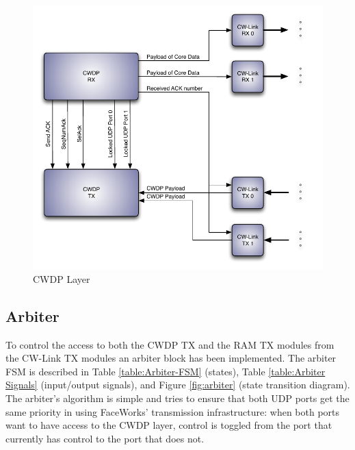 \documentclass[defaultstyle,10pt,master,Helvetica]{thesis}
\begin{document}
\begin{figure}[h]
  \centering
      \includegraphics[scale=1,center]{Diagrams/CWDP-simplified-transaction-2.pdf}
  \caption{\ac{CWDP} Layer}\label{fig:CWDPSIMP2}
\end{figure}

\clearpage
\subsection{Arbiter}



To control the access to both the \ac{CWDP} TX and the RAM TX modules from the CW-Link TX modules an arbiter block has been implemented. The arbiter \ac{FSM} is described in Table \ref{table:Arbiter-FSM} (states), Table \ref{table:Arbiter Signals} (input/output signals), and Figure \ref{fig:arbiter} (state transition diagram). The arbiter's algorithm is simple and tries to ensure that both UDP ports get the same priority in using FaceWorks' transmission infrastructure: when both ports want to have access to the CWDP layer, control is toggled from the port that currently has control to the port that does not.


\end{document}
